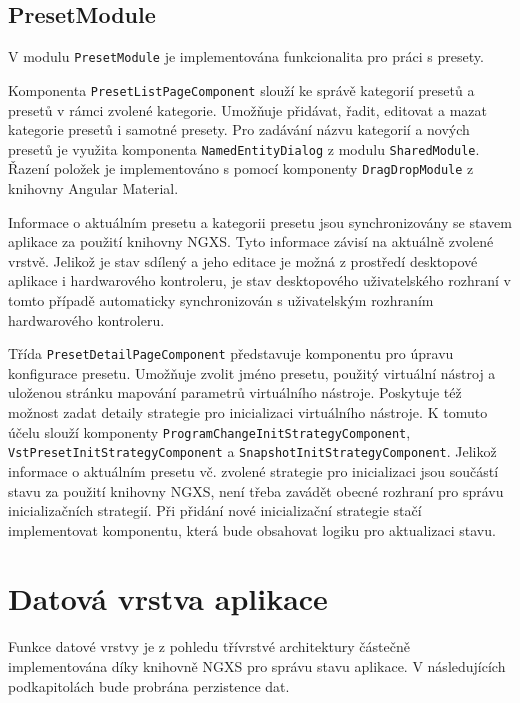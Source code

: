 \documentclass[thesis=M,czech]{FITthesis}[2019/03/06]
\begin{document}
		\subsection{PresetModule}
			V modulu \texttt{Preset\-Module} je implementována funkcionalita pro práci s presety.
			
			Komponenta \texttt{Preset\-List\-Page\-Component} slouží ke správě kategorií presetů a presetů v rámci zvolené kategorie.
			Umožňuje přidávat, řadit, editovat a mazat kategorie presetů i samotné presety. Pro zadávání názvu kategorií a nových presetů je využita komponenta \texttt{Named\-Entity\-Dialog} z modulu \texttt{SharedModule}. Řazení položek je implementováno s pomocí komponenty \texttt{Drag\-Drop\-Module} z knihovny Angular Material.

			Informace o aktuálním presetu a kategorii presetu jsou synchronizovány se stavem aplikace za použití knihovny NGXS.
			Tyto informace závisí na aktuálně zvolené vrstvě. Jelikož je stav sdílený a jeho editace je možná z prostředí desktopové aplikace i hardwarového kontroleru, je stav desktopového uživatelského rozhraní v tomto případě automaticky synchronizován s uživatelským rozhraním hardwarového kontroleru.
			
			Třída \texttt{Preset\-Detail\-Page\-Component} představuje komponentu pro úpravu konfigurace presetu.
			Umožňuje zvolit jméno presetu, použitý virtuální nástroj a uloženou stránku mapování parametrů virtuálního nástroje.
			Poskytuje též možnost zadat detaily strategie pro inicializaci virtuálního nástroje. K tomuto účelu slouží 
			komponenty \texttt{Program\-Change\-Init\-Strategy\-Component}, \linebreak \texttt{Vst\-Preset\-Init\-Strategy\-Component} a \texttt{Snapshot\-Init\-Strategy\-Component}. Jelikož informace o aktuálním presetu vč. zvolené strategie pro inicializaci jsou součástí stavu za použití knihovny NGXS, není třeba zavádět obecné rozhraní pro správu inicializačních strategií. 
			Při přidání nové inicializační strategie stačí implementovat komponentu, která bude obsahovat logiku pro aktualizaci stavu.
			
		
	\section{Datová vrstva aplikace}
		Funkce datové vrstvy je z pohledu třívrstvé architektury částečně implementována díky knihovně NGXS pro správu stavu aplikace.
		V následujících podkapitolách bude probrána perzistence dat.
	
\end{document}

